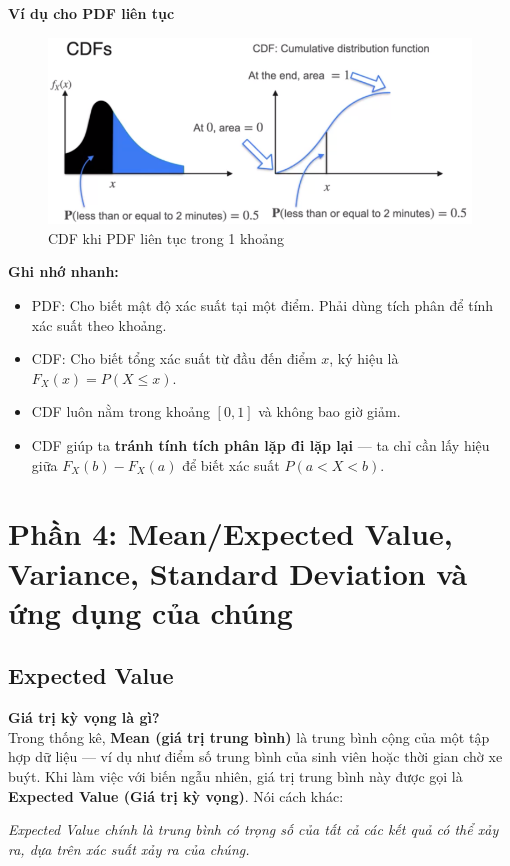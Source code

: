 \documentclass[11pt]{article}
\begin{document}
\vspace{1em}

\textbf{Ví dụ cho PDF liên tục}

\begin{figure}[H]
    \centering
    \includegraphics[width=0.8\linewidth]{images/pdf2cmf2.png}
    \caption{CDF khi PDF liên tục trong 1 khoảng}
\end{figure}

\vspace{1em}

\begin{summarybox}
    \textbf{Ghi nhớ nhanh:}
    \begin{itemize}
        \item PDF: Cho biết mật độ xác suất tại một điểm. Phải dùng tích phân để tính xác suất theo khoảng.
        \item CDF: Cho biết tổng xác suất từ đầu đến điểm $x$, ký hiệu là $F_X(x) = P(X \leq x)$.
        \item CDF luôn nằm trong khoảng $[0, 1]$ và không bao giờ giảm.
        \item CDF giúp ta \textbf{tránh tính tích phân lặp đi lặp lại} — ta chỉ cần lấy hiệu giữa $F_X(b) - F_X(a)$ để biết xác suất $P(a < X < b)$.
    \end{itemize}
\end{summarybox}

\section{Phần 4: Mean/Expected Value, Variance, Standard Deviation và ứng dụng của chúng}
\subsection{Expected Value}

\textbf{Giá trị kỳ vọng là gì?} \\
Trong thống kê, \textbf{Mean (giá trị trung bình)} là trung bình cộng của một tập hợp dữ liệu — ví dụ như điểm số trung bình của sinh viên hoặc thời gian chờ xe buýt. Khi làm việc với biến ngẫu nhiên, giá trị trung bình này được gọi là \textbf{Expected Value (Giá trị kỳ vọng)}. Nói cách khác:
\begin{center}
    \textit{Expected Value chính là trung bình có trọng số của tất cả các kết quả có thể xảy ra, dựa trên xác suất xảy ra của chúng.}
\end{center}
\end{document}

